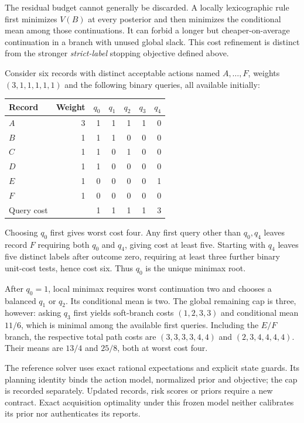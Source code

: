 \documentclass[11pt,a4paper]{article}
\theoremstyle{definition}\newtheorem{definition}[theorem]{Definition}
\begin{document}
The residual budget cannot generally be discarded. A locally lexicographic rule first minimizes $V(B)$ at every posterior and then minimizes the conditional mean among those continuations. It can forbid a longer but cheaper-on-average continuation in a branch with unused global slack. This cost refinement is distinct from the stronger \emph{strict-label} stopping objective defined above.

Consider six records with distinct acceptable actions named $A,\ldots,F$, weights $(3,1,1,1,1,1)$ and the following binary queries, all available initially:
\begin{center}\small
\begin{tabular}{@{}lrrrrrr@{}}\toprule
Record & Weight & $q_0$ & $q_1$ & $q_2$ & $q_3$ & $q_4$\\\midrule
$A$ & 3 & 1 & 1 & 1 & 1 & 0\\
$B$ & 1 & 1 & 1 & 0 & 0 & 0\\
$C$ & 1 & 1 & 0 & 1 & 0 & 0\\
$D$ & 1 & 1 & 0 & 0 & 0 & 0\\
$E$ & 1 & 0 & 0 & 0 & 0 & 1\\
$F$ & 1 & 0 & 0 & 0 & 0 & 0\\\midrule
Query cost & & 1 & 1 & 1 & 1 & 3\\\bottomrule
\end{tabular}
\end{center}
Choosing $q_0$ first gives worst cost four. Any first query other than $q_0,q_4$ leaves record $F$ requiring both $q_0$ and $q_4$, giving cost at least five. Starting with $q_4$ leaves five distinct labels after outcome zero, requiring at least three further binary unit-cost tests, hence cost six. Thus $q_0$ is the unique minimax root.

After $q_0=1$, local minimax requires worst continuation two and chooses a balanced $q_1$ or $q_2$. Its conditional mean is two. The global remaining cap is three, however: asking $q_3$ first yields soft-branch costs $(1,2,3,3)$ and conditional mean $11/6$, which is minimal among the available first queries. Including the $E/F$ branch, the respective total path costs are $(3,3,3,3,4,4)$ and $(2,3,4,4,4,4)$. Their means are $13/4$ and $25/8$, both at worst cost four.

The reference solver uses exact rational expectations and explicit state guards. Its planning identity binds the action model, normalized prior and objective; the cap is recorded separately. Updated records, risk scores or priors require a new contract. Exact acquisition optimality under this frozen model neither calibrates its prior nor authenticates its reports.
\end{document}

